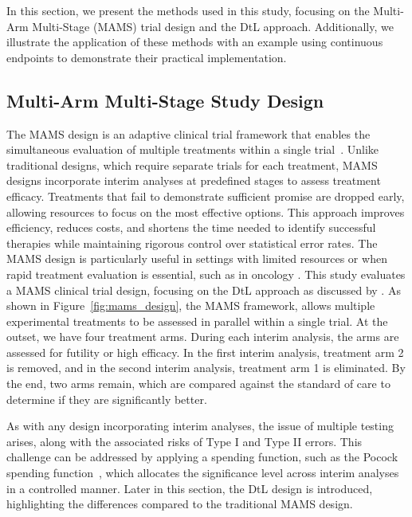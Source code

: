 \documentclass[11pt, a4paper]{article}\usepackage[]{graphicx}\usepackage[]{xcolor}
\begin{document}
In this section, we present the methods used in this study, focusing on the Multi-Arm Multi-Stage (MAMS) trial design and the DtL approach. Additionally, we illustrate the application of these methods with an example using continuous endpoints to demonstrate their practical implementation.


\subsection{Multi-Arm Multi-Stage Study Design}

The MAMS design is an adaptive clinical trial framework that enables the simultaneous evaluation of multiple treatments within a single trial~\citep{Jaki2013}. Unlike traditional designs, which require separate trials for each treatment, MAMS designs incorporate interim analyses at predefined stages to assess treatment efficacy. Treatments that fail to demonstrate sufficient promise are dropped early, allowing resources to focus on the most effective options. This approach improves efficiency, reduces costs, and shortens the time needed to identify successful therapies while maintaining rigorous control over statistical error rates. The MAMS design is particularly useful in settings with limited resources or when rapid treatment evaluation is essential, such as in oncology \citep{Royston2003MAMS}. This study evaluates a MAMS clinical trial design, focusing on the DtL approach as discussed by \cite{Wason2017DropTheLosers}. As shown in Figure~\ref{fig:mams_design}, the MAMS framework, allows multiple experimental treatments to be assessed in parallel within a single trial. At the outset, we have four treatment arms. During each interim analysis, the arms are assessed for futility or high efficacy. In the first interim analysis, treatment arm 2 is removed, and in the second interim analysis, treatment arm 1 is eliminated. By the end, two arms remain, which are compared against the standard of care to determine if they are significantly better.

As with any design incorporating interim analyses, the issue of multiple testing arises, along with the associated risks of Type I and Type II errors. This challenge can be addressed by applying a spending function, such as the Pocock spending function~\citep{spendingFunction}, which allocates the significance level across interim analyses in a controlled manner. Later in this section, the DtL design is introduced, highlighting the differences compared to the traditional MAMS design.
\end{document}
